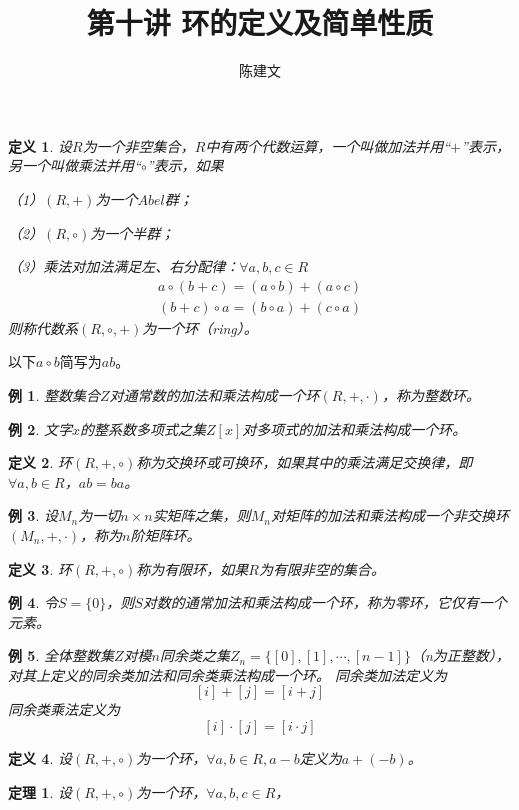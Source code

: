 \documentclass{article}
\newtheorem{Def}{定义}
\newtheorem{Thm}{定理}
\newtheorem*{Example}{例}
\begin{document}
\begin{CJK*}{UTF8}{gbsn}
  \title{第十讲 环的定义及简单性质}
  \author{陈建文}
  \maketitle
  
\begin{Def}
  设$R$为一个非空集合，$R$中有两个代数运算，一个叫做加法并用“$+$”表示，另一个叫做乘法并用“$\circ$”表示，如果

  （1）$(R,+)$为一个$Abel$群；

  （2）$(R,\circ)$为一个半群；

  （3）乘法对加法满足左、右分配律：$\forall a,b,c\in R$
\begin{align*}
  a\circ(b+c)=(a\circ b)+(a\circ c)\\
  (b+c)\circ a=(b\circ a) + (c\circ a)
\end{align*}
则称代数系$(R,\circ,+)$为一个环（ring）。
\end{Def}
以下$a\circ b$简写为$ab$。
\begin{Example}
  整数集合$Z$对通常数的加法和乘法构成一个环$(R,+,\cdot)$，称为整数环。
\end{Example}

\begin{Example}
  文字$x$的整系数多项式之集$Z[x]$对多项式的加法和乘法构成一个环。
\end{Example}

\begin{Def}
环$(R,+,\circ)$称为交换环或可换环，如果其中的乘法满足交换律，即$\forall a,b\in R$，$ab=ba$。
\end{Def}

\begin{Example}
  设$M_n$为一切$n\times n$实矩阵之集，则$M_n$对矩阵的加法和乘法构成一个非交换环$(M_n,+,\cdot)$，称为$n$阶矩阵环。
\end{Example}

\begin{Def}
  环$(R,+,\circ)$称为有限环，如果$R$为有限非空的集合。
\end{Def}
\begin{Example}
  令$S=\{0\}$，则$S$对数的通常加法和乘法构成一个环，称为零环，它仅有一个元素。
\end{Example}
\begin{Example}
  全体整数集$Z$对模$n$同余类之集$Z_n=\{[0],[1],\cdots,[n-1]\}$（n为正整数），对其上定义的同余类加法和同余类乘法构成一个环。
  同余类加法定义为
  \[[i]+[j]=[i+j]\]
  同余类乘法定义为
  \[[i]\cdot [j]=[i\cdot j]\]
\end{Example}
\begin{Def}
  设$(R,+,\circ)$为一个环，$\forall a,b\in R,a-b$定义为$a+(-b)$。
\end{Def}
\begin{Thm}
  设$(R,+,\circ)$为一个环，$\forall a,b,c\in R$，


\end{Thm}
\end{CJK*}
\end{document}
